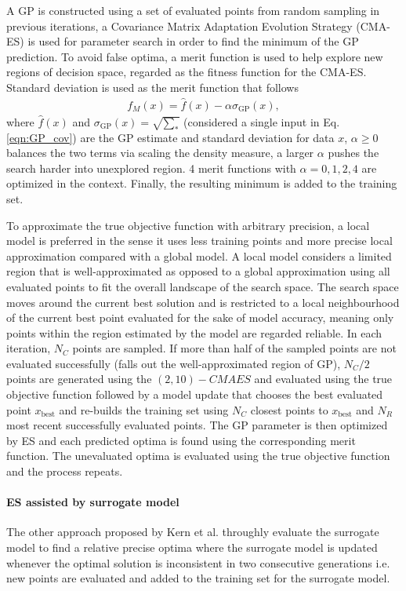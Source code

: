 A GP is constructed using a set of evaluated points from random sampling in previous iterations, a Covariance Matrix Adaptation Evolution Strategy (CMA-ES) is used for parameter search in order to find the minimum of the GP prediction. To avoid false optima, a merit function is used to help explore new regions of decision space, regarded as the fitness function for the CMA-ES.   
Standard deviation is used as the merit function that follows 
\begin{align}
f_M (x) = \hat f(x) - \alpha \sigma_{\text{GP}} (x),
\end{align}
where $\hat f(x)$ and $\sigma_{\text{GP}} (x)=\sqrt{\sum_*}$ (considered a single input in Eq. \ref{eqn:GP_cov}) are the GP estimate and standard deviation for data $x$, $\alpha \geq 0$ balances the two terms via scaling the density measure, a larger $\alpha$ pushes the search harder into unexplored region. 4 merit functions with $\alpha =0,1,2,4$ are optimized in the context. Finally, the resulting minimum is added to the training set.

To approximate the true objective function with arbitrary precision, a local model is preferred in the sense it uses less training points and more precise local approximation compared with a global model. A local model considers a limited region that is well-approximated as opposed to a 
global approximation using all evaluated points to fit the overall landscape of the search space.
The search space moves around the current best solution and is restricted to a local neighbourhood of the current best point evaluated for the sake of model accuracy, meaning only points within the region estimated by the model are regarded reliable. In each iteration, $N_C$ points are sampled. If more than half of the sampled points are not evaluated successfully (falls out the well-approximated region of GP), $N_C/2$ points are generated using the $(2,10)-CMAES$ and evaluated using the true objective function followed by a model update that chooses the best evaluated point $x_{\text{best}}$ and re-builds the training set using $N_C$ closest points to $x_{\text{best}}$ and $N_R$ most recent successfully evaluated points. The GP parameter is then optimized by ES and each predicted optima is found using the corresponding merit function. The unevaluated optima is evaluated using the true objective function and the process repeats.






\paragraph{ES assisted by surrogate model}
The other approach proposed by Kern et al. \cite{10.1007/11844297_95} throughly evaluate the surrogate model to find a relative precise optima where the surrogate model is updated whenever the optimal solution is inconsistent in two consecutive generations i.e. new points are evaluated and added to the training set for the surrogate model.  



